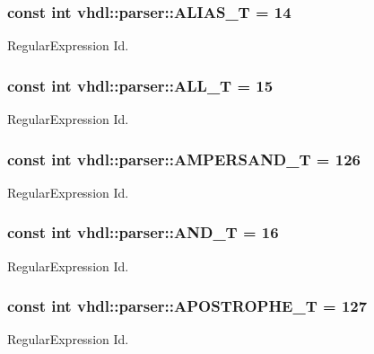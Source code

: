 \subsubsection[{A\+L\+I\+A\+S\+\_\+\+T}]{\setlength{\rightskip}{0pt plus 5cm}const int vhdl\+::parser\+::\+A\+L\+I\+A\+S\+\_\+\+T = 14}\label{namespacevhdl_1_1parser_acae81aea8007d66faa9e2207c709538a}
Regular\+Expression Id. \hypertarget{namespacevhdl_1_1parser_aa3fadce9c7f5c36307d0b57f33ae7e69}{}
\subsubsection[{A\+L\+L\+\_\+\+T}]{\setlength{\rightskip}{0pt plus 5cm}const int vhdl\+::parser\+::\+A\+L\+L\+\_\+\+T = 15}\label{namespacevhdl_1_1parser_aa3fadce9c7f5c36307d0b57f33ae7e69}
Regular\+Expression Id. \hypertarget{namespacevhdl_1_1parser_a3da2deb2aa4ed415eeb2b10f1cea0cdf}{}
\subsubsection[{A\+M\+P\+E\+R\+S\+A\+N\+D\+\_\+\+T}]{\setlength{\rightskip}{0pt plus 5cm}const int vhdl\+::parser\+::\+A\+M\+P\+E\+R\+S\+A\+N\+D\+\_\+\+T = 126}\label{namespacevhdl_1_1parser_a3da2deb2aa4ed415eeb2b10f1cea0cdf}
Regular\+Expression Id. \hypertarget{namespacevhdl_1_1parser_ae7eb5bb9e1ee14c0eaaa09da78e92a22}{}
\subsubsection[{A\+N\+D\+\_\+\+T}]{\setlength{\rightskip}{0pt plus 5cm}const int vhdl\+::parser\+::\+A\+N\+D\+\_\+\+T = 16}\label{namespacevhdl_1_1parser_ae7eb5bb9e1ee14c0eaaa09da78e92a22}
Regular\+Expression Id. \hypertarget{namespacevhdl_1_1parser_a42197cba15faa8f0335a964fc96f76f9}{}
\subsubsection[{A\+P\+O\+S\+T\+R\+O\+P\+H\+E\+\_\+\+T}]{\setlength{\rightskip}{0pt plus 5cm}const int vhdl\+::parser\+::\+A\+P\+O\+S\+T\+R\+O\+P\+H\+E\+\_\+\+T = 127}\label{namespacevhdl_1_1parser_a42197cba15faa8f0335a964fc96f76f9}
Regular\+Expression Id. \hypertarget{namespacevhdl_1_1parser_af0012e28fb9ccb82c9da77dea0e16306}{}
